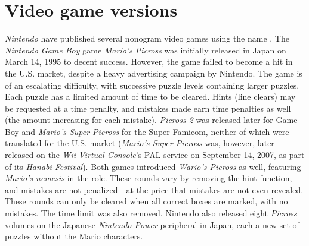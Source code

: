 \chapter{Video game versions}
\textit{Nintendo} have published several nonogram video games using the name . The \textit{Nintendo Game Boy} game \textit{\textit{Mario's Picross}} was initially released in Japan on March 14, 1995 to decent success. However, the game failed to become a hit in the U.S. market, despite a heavy advertising campaign by Nintendo. The game is of an escalating difficulty, with successive puzzle levels containing larger puzzles. Each puzzle has a limited amount of time to be cleared. Hints (line clears) may be requested at a time penalty, and mistakes made earn time penalties as well (the amount increasing for each mistake). \textit{Picross 2} was released later for Game Boy and \textit{\textit{Mario's Super Picross}} for the Super Famicom, neither of which were translated for the U.S. market (\textit{Mario's Super Picross} was, however, later released on the \textit{Wii} \textit{Virtual Console}'s PAL service on September 14, 2007, as part of its \textit{Hanabi Festival}). Both games introduced \textit{Wario's Picross} as well, featuring \textit{Mario's nemesis} in the role. These rounds vary by removing the hint function, and mistakes are not penalized - at the price that mistakes are not even revealed. These rounds can only be cleared when all correct boxes are marked, with no mistakes. The time limit was also removed. Nintendo also released eight \textit{Picross} volumes on the Japanese \textit{Nintendo Power} peripheral in Japan, each a new set of puzzles without the Mario characters.

